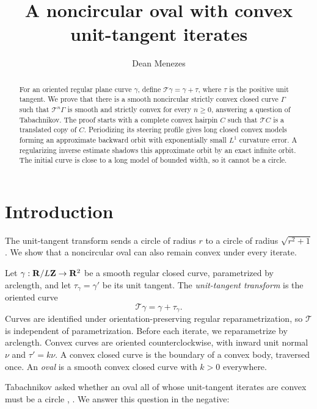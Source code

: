 \documentclass[11pt]{article}
\title{A noncircular oval with convex unit-tangent iterates}
\author{Dean Menezes}
\date{}
\numberwithin{equation}{section}
\newcommand{\R}{{\bf R}}
\newcommand{\Z}{{\bf Z}}
\newcommand{\Tmap}{\mathcal T}
\begin{document}
\maketitle

\begin{abstract}
For an oriented regular plane curve \(\gamma\), define
\(\Tmap\gamma=\gamma+\tau\), where \(\tau\) is the positive unit tangent.
We prove that there is a smooth noncircular strictly convex closed curve
\(\Gamma\) such that \(\Tmap^n\Gamma\) is smooth and strictly convex for
every \(n\geq0\), answering a question of Tabachnikov. The proof starts
with a complete convex hairpin $C$ such that $\Tmap C$ is a translated copy of $C$.
Periodizing its steering profile gives long closed convex models forming an
approximate backward orbit with exponentially small \(L^1\) curvature
error. A regularizing inverse estimate shadows this approximate orbit by an
exact infinite orbit. The initial curve is close to a long model of bounded
width, so it cannot be a circle.
\end{abstract}

\section{Introduction}

The unit-tangent transform sends a circle of radius \(r\) to a circle of
radius \(\sqrt{r^2+1}\). We show that a noncircular oval can also remain
convex under every iterate.

Let \(\gamma:\R/L\Z\to\R^2\) be a smooth regular closed curve,
parametrized by arclength, and let \(\tau_\gamma=\gamma'\) be its unit tangent.
The \emph{unit-tangent transform} is the oriented curve
\begin{equation}\label{eq:Tdef}
  \Tmap\gamma=\gamma+\tau_\gamma.
\end{equation}
Curves are identified under orientation-preserving regular
reparametrization, so \(\Tmap\) is independent of parametrization. Before
each iterate, we reparametrize by arclength. Convex curves are
oriented counterclockwise, with inward unit normal \(\nu\) and
\(\tau'=k\nu\). A convex closed curve is the boundary of a convex body,
traversed once. An \emph{oval} is a smooth convex closed curve with
\(k>0\) everywhere.

Tabachnikov asked whether an oval all of whose unit-tangent iterates are
convex must be a circle \cite[Section~9]{Tabachnikov2015},
\cite[Conjecture~4]{Tabachnikov2023}. We answer this question in the negative:
\end{document}
